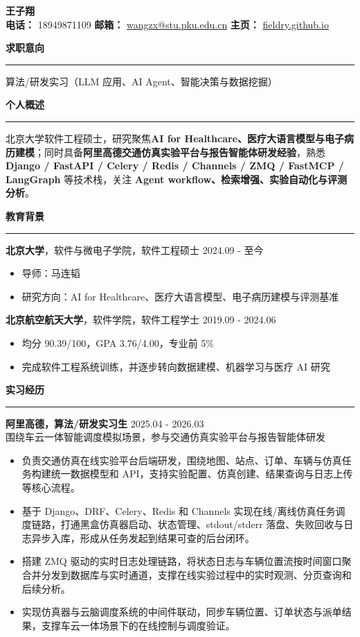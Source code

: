 \documentclass[10pt,a4paper]{ctexart}
\newcommand{\sectiontitle}[1]{
    \vspace{4mm}
    {\large\textbf{#1}}
    \vspace{1mm}
    \hrule
    \vspace{3mm}
}
\newcommand{\entryhead}[2]{
    {#1} \hfill #2 \\
}
\newcommand{\projectentry}[4]{
    \noindent
    \textbf{#1} \hfill #2 \\
    {\small #3} \\
    #4
    \vspace{2mm}
}
\begin{document}
\begin{center}
{\huge\textbf{王子翔}}\\
\vspace{2mm}
\textbf{电话：} 18949871109 \hspace{4mm}
\textbf{邮箱：} \href{mailto:wangzx@stu.pku.edu.cn}{wangzx@stu.pku.edu.cn} \hspace{4mm}
\textbf{主页：} \href{https://fieldry.github.io}{fieldry.github.io}
\end{center}

\sectiontitle{求职意向}

算法/研发实习（LLM 应用、AI Agent、智能决策与数据挖掘）

\sectiontitle{个人概述}

北京大学软件工程硕士，研究聚焦\textbf{AI for Healthcare、医疗大语言模型与电子病历建模}；同时具备\textbf{阿里高德交通仿真实验平台与报告智能体研发经验}，熟悉 \textbf{Django / FastAPI / Celery / Redis / Channels / ZMQ / FastMCP / LangGraph} 等技术栈，关注 \textbf{Agent workflow、检索增强、实验自动化与评测分析}。

\sectiontitle{教育背景}

\entryhead{\textbf{北京大学}，软件与微电子学院，软件工程硕士}{2024.09 - 至今}
\begin{itemize}
    \item 导师：马连韬
    \item 研究方向：AI for Healthcare、医疗大语言模型、电子病历建模与评测基准
\end{itemize}

\entryhead{\textbf{北京航空航天大学}，软件学院，软件工程学士}{2019.09 - 2024.06}
\begin{itemize}
    \item 均分 90.39/100，GPA 3.76/4.00，专业前 5\%
    \item 完成软件工程系统训练，并逐步转向数据建模、机器学习与医疗 AI 研究
\end{itemize}

\sectiontitle{实习经历}

\projectentry
{阿里高德，算法/研发实习生}
{2025.04 - 2026.03}
{围绕车云一体智能调度模拟场景，参与交通仿真实验平台与报告智能体研发}
{
\begin{itemize}
    \item 负责交通仿真在线实验平台后端研发，围绕地图、站点、订单、车辆与仿真任务构建统一数据模型和 API，支持实验配置、仿真创建、结果查询与日志上传等核心流程。
    \item 基于 Django、DRF、Celery、Redis 和 Channels 实现在线/离线仿真任务调度链路，打通黑盒仿真器启动、状态管理、stdout/stderr 落盘、失败回收与日志异步入库，形成从任务发起到结果可查的后台闭环。
    \item 搭建 ZMQ 驱动的实时日志处理链路，将状态日志与车辆位置流按时间窗口聚合并分发到数据库与实时通道，支撑在线实验过程中的实时观测、分页查询和后续分析。
    \item 实现仿真器与云脑调度系统的中间件联动，同步车辆位置、订单状态与派单结果，支撑车云一体场景下的在线控制与调度验证。
\end{itemize}
}
\end{document}
